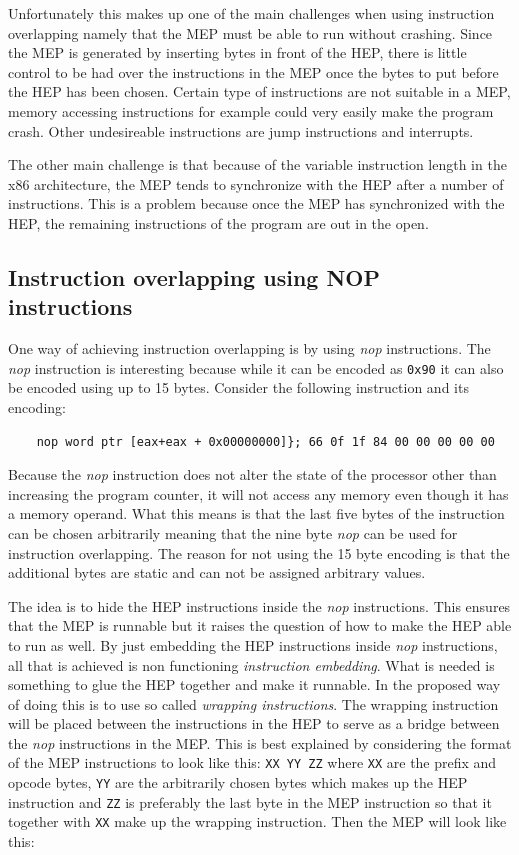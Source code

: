 \documentclass[11pt,twoside]{eitExjobb}
\begin{document}
Unfortunately this makes up one of the main challenges when using instruction overlapping namely that the MEP must be able to run without crashing. Since the MEP is generated by inserting bytes in front of the HEP, there is little control to be had over the instructions in the MEP once the bytes to put before the HEP has been chosen.  Certain type of instructions are not suitable in a MEP, memory accessing instructions for example could very easily make the program crash. Other undesireable instructions are jump instructions  and interrupts.

The other main challenge is that because of the variable instruction length in the x86 architecture, the MEP tends to synchronize with the HEP after a number of instructions. This is a problem because once the MEP has synchronized with the HEP, the remaining instructions of the program are out in the open. 

\subsection{Instruction overlapping using NOP instructions} 
One way of achieving instruction overlapping is by using \emph{nop} instructions\cite{instructionoverlapping}. The \emph{nop} instruction is interesting because while it can be encoded as \texttt{0x90} it can also be encoded using up to 15 bytes. Consider the following instruction and its encoding: 
\begin{verbatim}
    nop word ptr [eax+eax + 0x00000000]}; 66 0f 1f 84 00 00 00 00 00         
\end{verbatim}

\noindent Because the \emph{nop} instruction does not alter the state of the processor other than increasing the program counter, it will not access any memory even though it has a memory operand. What this means is that the last five bytes of the instruction can be chosen arbitrarily meaning that the nine byte \emph{nop} can be used for instruction overlapping. The reason for not using the 15 byte encoding is that the additional bytes are static and can not be assigned arbitrary values.

The idea is to hide the HEP instructions inside the \emph{nop} instructions. This ensures that the MEP is runnable but it raises the question of how to make the HEP able to run as well. By just embedding the HEP instructions inside \emph{nop} instructions, all that is achieved is non functioning \emph{instruction embedding}. What is needed is something to glue the HEP together and make it runnable. In \cite{instructionoverlapping} the proposed way of doing this is to use so called \emph{wrapping instructions}. The wrapping instruction will be placed between the instructions in the HEP to serve as a bridge between the \emph{nop} instructions in the MEP. This is best explained by considering the format of the MEP instructions to look like this: \texttt{XX YY ZZ} where \texttt{XX} are the prefix and opcode bytes, \texttt{YY} are the arbitrarily chosen bytes which makes up the HEP instruction and \texttt{ZZ} is preferably the last byte in the MEP instruction so that it together with \texttt{XX} make up the wrapping instruction. Then the MEP will look like this:
\end{document}
